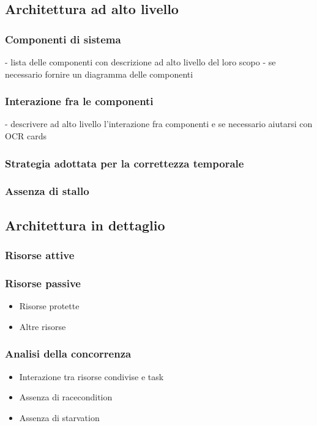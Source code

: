 \subsection{Architettura ad alto livello}
\subsubsection{Componenti di sistema}
 - lista delle componenti con descrizione ad alto livello del loro scopo
 - se necessario fornire un diagramma delle componenti
\subsubsection{Interazione fra le componenti}
 - descrivere ad alto livello l'interazione fra componenti e se necessario aiutarsi con OCR cards
\subsubsection{Strategia adottata per la correttezza temporale}
\subsubsection{Assenza di stallo}
\subsection{Architettura in dettaglio}
\subsubsection{Risorse attive}
\subsubsection{Risorse passive}
\begin{itemize}
\item{Risorse protette}
\item{Altre risorse}
\end{itemize}
\subsubsection{Analisi della concorrenza}
\begin{itemize}
\item{Interazione tra risorse condivise e task}
\item{Assenza di racecondition}
\item{Assenza di starvation}
\end{itemize}
